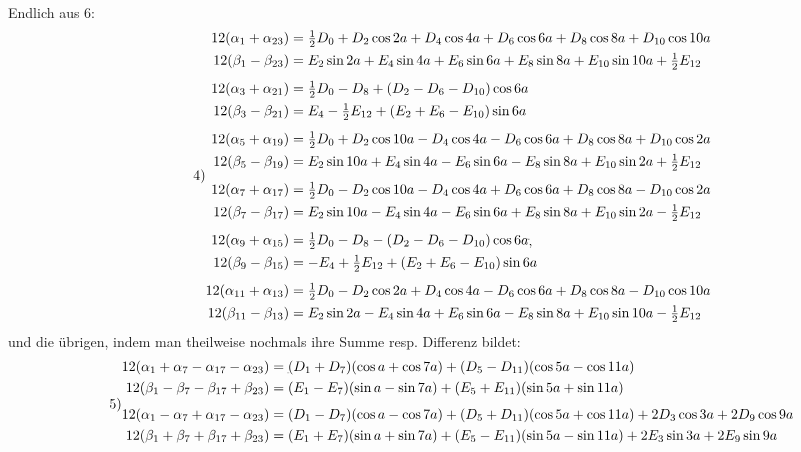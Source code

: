 \begin{landscape}
\[\begin{aligned}
\end{aligned}
\]
\clearpage{}
\par\noindent\hspace*{\parindent}Endlich aus 6:
\[
\tag*{4)}
\begin{aligned}
12(\alpha_1+\alpha_{23})&=\tfrac12 D_0+D_2\cos2a+D_4\cos4a+D_6\cos6a+D_8\cos8a+D_{10}\cos10a\\
12(\beta_1-\beta_{23})&=E_2\sin2a+E_4\sin4a+E_6\sin6a+E_8\sin8a+E_{10}\sin10a+\tfrac12 E_{12}\\[4pt]
12(\alpha_3+\alpha_{21})&=\tfrac12 D_0-D_8+(D_2-D_6-D_{10})\cos6a\\
12(\beta_3-\beta_{21})&=E_4-\tfrac12 E_{12}+(E_2+E_6-E_{10})\sin6a\\[4pt]
12(\alpha_5+\alpha_{19})&=\tfrac12 D_0+D_2\cos10a-D_4\cos4a-D_6\cos6a+D_8\cos8a+D_{10}\cos2a\\
12(\beta_5-\beta_{19})&=E_2\sin10a+E_4\sin4a-E_6\sin6a-E_8\sin8a+E_{10}\sin2a+\tfrac12 E_{12}\\[4pt]
12(\alpha_7+\alpha_{17})&=\tfrac12 D_0-D_2\cos10a-D_4\cos4a+D_6\cos6a+D_8\cos8a-D_{10}\cos2a\\
12(\beta_7-\beta_{17})&=E_2\sin10a-E_4\sin4a-E_6\sin6a+E_8\sin8a+E_{10}\sin2a-\tfrac12 E_{12}\\[4pt]
12(\alpha_9+\alpha_{15})&=\tfrac12 D_0-D_8-(D_2-D_6-D_{10})\cos6a\VthreeTerminalPair\\
12(\beta_9-\beta_{15})&=-E_4+\tfrac12 E_{12}+(E_2+E_6-E_{10})\sin6a\\[4pt]
12(\alpha_{11}+\alpha_{13})&=\tfrac12 D_0-D_2\cos2a+D_4\cos4a-D_6\cos6a+D_8\cos8a-D_{10}\cos10a\\
12(\beta_{11}-\beta_{13})&=E_2\sin2a-E_4\sin4a+E_6\sin6a-E_8\sin8a+E_{10}\sin10a-\tfrac12 E_{12}
\end{aligned}
\]
und die übrigen, indem man theilweise nochmals ihre Summe resp. Differenz bildet:
\[
\tag*{5)}
\begin{aligned}
12(\alpha_1+\alpha_7-\alpha_{17}-\alpha_{23})&=\VthreeLowDash(D_1+D_7)(\cos a+\cos7a)+(D_5-D_{11})(\cos5a-\cos11a)\\
12(\beta_1-\beta_7-\beta_{17}+\beta_{23})&=(E_1-E_7)(\sin a-\sin7a)+(E_5+E_{11})(\sin5a+\sin11a)\\[4pt]
12(\alpha_1-\alpha_7+\alpha_{17}-\alpha_{23})&=(D_1-D_7)(\cos a-\cos7a)+(D_5+D_{11})(\cos5a+\cos11a)+2D_3\cos3a+2D_9\cos9a\\
12(\beta_1+\beta_7+\beta_{17}+\beta_{23})&=(E_1+E_7)(\sin a+\sin7a)+(E_5-E_{11})(\sin5a-\sin11a)+2E_3\sin3a+2E_9\sin9a\\[4pt]

\end{aligned}\]
\end{landscape}
